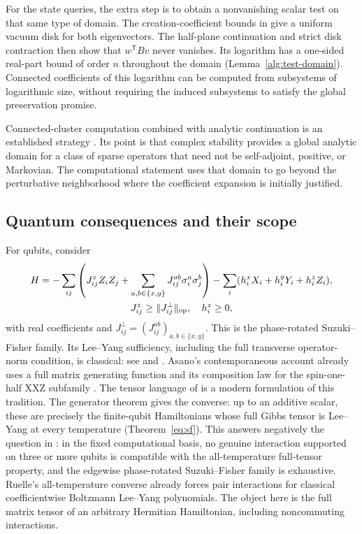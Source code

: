\documentclass[reqno]{amsart}
\theoremstyle{definition}
\theoremstyle{remark}
\begin{document}
For the state queries, the extra step is to obtain a nonvanishing
scalar test on that same type of domain. The creation-coefficient
bounds in \cite{BDL08} give a uniform vacuum disk for both eigenvectors.
The half-plane continuation and strict disk contraction then show
that $w^{\mathsf T}Bv$ never vanishes. Its logarithm has a one-sided
real-part bound of order $n$ throughout the domain
(Lemma~\ref{alg:test-domain}). Connected coefficients of this logarithm
can be computed from subsystems of logarithmic size, without requiring
the induced subsystems to satisfy the global preservation promise.

Connected-cluster computation combined with analytic continuation is an
established strategy
\cite{PatelRegts17,YYZ22,WildAlhambra23}.
Its point is that complex stability
provides a global analytic domain for a class of sparse operators that
need not be self-adjoint, positive, or Markovian. The computational
statement uses that domain to go beyond the perturbative neighborhood
where the coefficient expansion is initially justified.

\subsection{Quantum consequences and their scope}

For qubits, consider
\begin{equation}\label{intro:sf}
 \begin{gathered}
 H=-\sum_{ij}
 \left(J^z_{ij}Z_iZ_j+
       \sum_{a,b\in\{x,y\}}J^{ab}_{ij}\sigma_i^a\sigma_j^b\right)
   -\sum_i(h_i^xX_i+h_i^yY_i+h_i^zZ_i),
 \\
 J^z_{ij}\geq\|J^\perp_{ij}\|_{\rm op},\quad h_i^z\geq0 ,
 \end{gathered}
\end{equation}
with real coefficients and
$J^\perp_{ij}=(J^{ab}_{ij})_{a,b\in\{x,y\}}$.
This is the phase-rotated Suzuki--Fisher family.
Its Lee--Yang sufficiency, including the full transverse operator-norm
condition, is classical: see \cite[equation~(2.47)]{SuzukiFisher71}
and \cite[Theorem~2]{Dunlop79}. Asano's contemporaneous account already
uses a full matrix generating function and its composition law for the
spin-one-half XXZ subfamily \cite[equation~(1.15), Theorem~1]{AsanoJapanese70}.
The tensor language of \cite{WBG26} is a modern formulation of this
tradition.
The generator theorem gives the converse: up to an additive
scalar, these are precisely the finite-qubit Hamiltonians whose
full Gibbs tensor is Lee--Yang at every temperature
(Theorem~\ref{eq:sf}). This answers negatively the question in
\cite[Section~6, ``Beyond Suzuki--Fisher Hamiltonians'']{WBG26}:
in the fixed computational basis, no genuine interaction supported on
three or more qubits is compatible with the all-temperature full-tensor
property, and the edgewise phase-rotated Suzuki--Fisher family is
exhaustive. Ruelle's all-temperature converse
\cite[Theorem 9]{Ruelle10} already forces pair interactions for classical
coefficientwise Boltzmann Lee--Yang polynomials. The object here is the
full matrix tensor of an arbitrary Hermitian Hamiltonian, including
noncommuting interactions.
\end{document}
